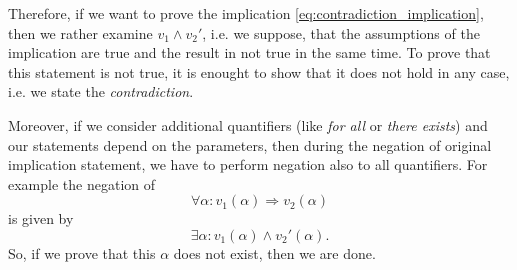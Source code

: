 Therefore, if we want to prove the implication \eqref{eq:contradiction_implication}, then we rather examine $v_1 \wedge v_2'$, i.e. we suppose, that the assumptions of the implication are true and the result in not true in the same time.
To prove that this statement is not true, it is enought to show that it does not hold in any case, i.e. we state the \emph{contradiction}.

Moreover, if we consider additional quantifiers (like \emph{for all} or \emph{there exists}) and our statements depend on the parameters, 
then during the negation of original implication statement, we have to perform negation also to all quantifiers.
For example the negation of
\begin{displaymath}
 \forall \alpha: v_1(\alpha) \Rightarrow v_2(\alpha)
\end{displaymath}
is given by
\begin{displaymath}
 \exists \alpha: v_1(\alpha) \wedge v_2'(\alpha).
\end{displaymath}
So, if we prove that this $\alpha$ does not exist, then we are done.
